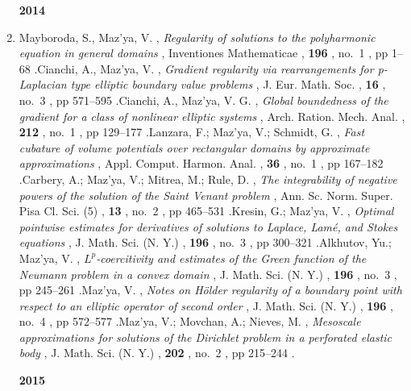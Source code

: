 \documentclass{article}
\newcommand{\authors}[1]{\item #1\ignorespaces}
\renewcommand{\title}[1]{, \textit{#1}\ignorespaces}
\newcommand{\journal}[1]{, {#1}\ignorespaces}
\newcommand{\volume}[1]{, \textbf{#1}\ignorespaces}
\newcommand{\no}[1]{, no.~{#1}\ignorespaces}
\newcommand{\pages}[1]{, pp #1\ignorespaces}
\newcommand{\jitem}[1]{.}
\begin{document}
\begin{enumerate}
\medskip

{\bf 2014}

\authors{Mayboroda, S.,  Maz'ya, V.}
\title{Regularity of solutions to the polyharmonic equation in general domains}
\journal{Inventiones Mathematicae}
\volume{196}
\no{1}
\pages{1--68}
\jitem


\authors{Cianchi, A., Maz'ya, V.}
\title{Gradient regularity via rearrangements for p-Laplacian type elliptic boundary
value problems}
\journal{ J. Eur. Math. Soc.}
\volume{16}
\no{3}
\pages{571--595}
\jitem


\authors{Cianchi, A., Maz'ya, V. G.}
\title{Global boundedness of the gradient for a class of nonlinear elliptic systems}
\journal{Arch. Ration. Mech. Anal.}
\volume{212}
\no{1}
\pages{129--177}
\jitem

\authors{Lanzara, F.; Maz'ya, V.; Schmidt, G.}
\title{Fast cubature of volume potentials over rectangular domains by
approximate approximations}
\journal{Appl. Comput. Harmon. Anal.}
\volume{36}
\no{1}
\pages{167--182}
\jitem

 \authors{Carbery, A.; Maz'ya, V.; Mitrea, M.; Rule, D.}
\title{The integrability of negative powers of the solution of the Saint Venant problem}
\journal{Ann. Sc. Norm. Super. Pisa Cl. Sci. (5)}
\volume{13}
\no{2}
\pages{465--531}
\jitem


\authors{Kresin, G.; Maz'ya, V.}
\title{Optimal pointwise estimates for derivatives of solutions to Laplace, Lam\'e, and Stokes equations}
\journal{J. Math. Sci. (N. Y.)}
\volume{196}
\no{3}
\pages{300--321}
\jitem

\authors{Alkhutov, Yu.; Maz'ya, V.}
\title{$L^p$-coercitivity and estimates of the Green function of the Neumann problem in a convex domain}
\journal{J. Math. Sci. (N. Y.)}
\volume{196}
\no{3}
\pages{245--261}
\jitem




\authors{Maz'ya, V.}
\title{Notes on H\"older regularity of a boundary point with respect to an elliptic operator of second order}
\journal{J. Math. Sci. (N. Y.)}
\volume{196}
\no{4}
\pages{572--577}
 \jitem



\authors{Maz'ya, V.; Movchan, A.; Nieves, M.}
\title{Mesoscale  approximations for solutions of the Dirichlet problem in a perforated elastic body}
 \journal{J. Math. Sci. (N. Y.)}
\volume{202}
\no{2}
\pages{215--244}
 \jitem




\medskip

{\bf 2015}


\end{enumerate}
\end{document}
